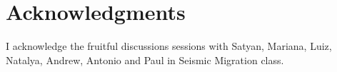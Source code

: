 \section{Acknowledgments}
I acknowledge the fruitful discussions  sessions with Satyan, Mariana, Luiz, Natalya, Andrew, Antonio and Paul in Seismic Migration class. 



